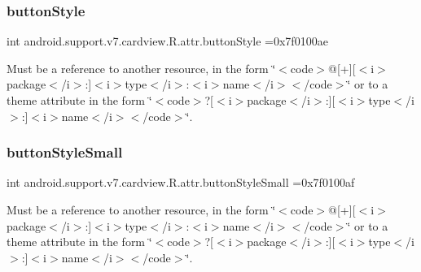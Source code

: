 \subsubsection{\texorpdfstring{button\+Style}{buttonStyle}}
{\footnotesize\ttfamily int android.\+support.\+v7.\+cardview.\+R.\+attr.\+button\+Style =0x7f0100ae\hspace{0.3cm}{\ttfamily [static]}}

Must be a reference to another resource, in the form \char`\"{}$<$code$>$@\mbox{[}+\mbox{]}\mbox{[}$<$i$>$package$<$/i$>$\+:\mbox{]}$<$i$>$type$<$/i$>$\+:$<$i$>$name$<$/i$>$$<$/code$>$\char`\"{} or to a theme attribute in the form \char`\"{}$<$code$>$?\mbox{[}$<$i$>$package$<$/i$>$\+:\mbox{]}\mbox{[}$<$i$>$type$<$/i$>$\+:\mbox{]}$<$i$>$name$<$/i$>$$<$/code$>$\char`\"{}. \mbox{\label{classandroid_1_1support_1_1v7_1_1cardview_1_1R_1_1attr_aee51161a62b9b1906e052f4465a89580}} 
\subsubsection{\texorpdfstring{button\+Style\+Small}{buttonStyleSmall}}
{\footnotesize\ttfamily int android.\+support.\+v7.\+cardview.\+R.\+attr.\+button\+Style\+Small =0x7f0100af\hspace{0.3cm}{\ttfamily [static]}}

Must be a reference to another resource, in the form \char`\"{}$<$code$>$@\mbox{[}+\mbox{]}\mbox{[}$<$i$>$package$<$/i$>$\+:\mbox{]}$<$i$>$type$<$/i$>$\+:$<$i$>$name$<$/i$>$$<$/code$>$\char`\"{} or to a theme attribute in the form \char`\"{}$<$code$>$?\mbox{[}$<$i$>$package$<$/i$>$\+:\mbox{]}\mbox{[}$<$i$>$type$<$/i$>$\+:\mbox{]}$<$i$>$name$<$/i$>$$<$/code$>$\char`\"{}. \mbox{\label{classandroid_1_1support_1_1v7_1_1cardview_1_1R_1_1attr_a0db1503d1c599ba43238d88c132063e7}} 
